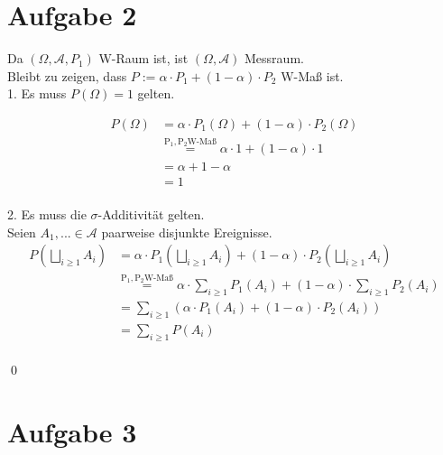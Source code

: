 \documentclass[10pt,a4paper]{article}
\begin{document}
\newpage

\section*{Aufgabe 2}
Da $(\Omega, \mathcal{A}, P_1)$ W-Raum ist, ist $(\Omega, \mathcal{A})$ Messraum.\\
Bleibt zu zeigen, dass $P:= \alpha \cdot P_1 + (1-\alpha)\cdot P_2$ W-Maß ist.\\[1ex]
1. Es muss $P(\Omega)=1$ gelten.

\begin{equation}
\begin{split}
P(\Omega) & = \alpha \cdot P_1(\Omega) + (1-\alpha)\cdot P_2(\Omega) \\
    &\overset{\mathrm{P_1, P_2 \text{W-Maß}}}{=}\alpha \cdot 1 + (1-\alpha) \cdot 1 \\
    & = \alpha + 1-\alpha \\
    & = 1
\end{split}
\end{equation}\\
2. Es muss die $\sigma$-Additivität gelten.\\
Seien $A_1,... \in \mathcal{A}$ paarweise disjunkte Ereignisse.\\

\begin{equation}
\begin{split}
P(\bigsqcup \limits_{i \geq 1 } A_i ) & = \alpha \cdot P_1(\bigsqcup \limits_{i \geq 1 } A_i ) + (1-\alpha)\cdot P_2(\bigsqcup \limits_{i \geq 1 } A_i) \\
&\overset{\mathrm{P_1, P_2 \text{W-Maß}}}{=} \alpha \cdot \sum \limits_{i \geq 1 } P_1(A_i) + (1-\alpha) \cdot \sum \limits_{i \geq 1 } P_2(A_i) \\
& = \sum \limits_{i \geq 1 }(\alpha \cdot P_1(A_i) + (1-\alpha) \cdot P_2(A_i)) \\
& = \sum \limits_{i \geq 1 } P(A_i)
\end{split}
\end{equation}\\
\qed
\newpage

\section*{Aufgabe 3}
\newpage
\end{document}
